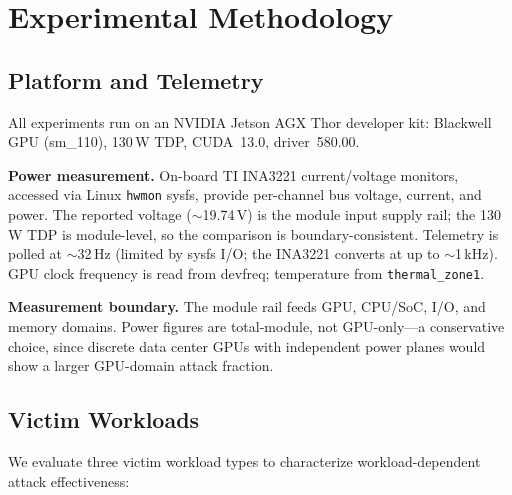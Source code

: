 \documentclass[letterpaper,twocolumn,10pt]{article}
\begin{document}
\section{Experimental Methodology}
\label{sec:method}

\subsection{Platform and Telemetry}
\label{sec:platform}

All experiments run on an NVIDIA Jetson AGX Thor developer kit:
Blackwell GPU (sm\_110), 130\,W TDP, CUDA~13.0, driver~580.00.

\textbf{Power measurement.}
On-board TI INA3221 current/voltage monitors, accessed via Linux
\texttt{hwmon} sysfs, provide per-channel bus voltage, current, and
power.  The reported voltage ($\sim$19.74\,V) is the module input
supply rail; the 130\,W TDP is module-level, so the comparison is
boundary-consistent.  Telemetry is polled at $\sim$32\,Hz (limited
by sysfs I/O; the INA3221 converts at up to $\sim$1\,kHz).
GPU clock frequency is read from devfreq; temperature from
\texttt{thermal\_zone1}.

\textbf{Measurement boundary.}
The module rail feeds GPU, CPU/SoC, I/O, and memory domains.
Power figures are total-module, not GPU-only---a conservative
choice, since discrete data center GPUs with independent power
planes would show a larger GPU-domain attack fraction.

\subsection{Victim Workloads}
\label{sec:victims}

We evaluate three victim workload types to characterize
workload-dependent attack effectiveness:
\end{document}
